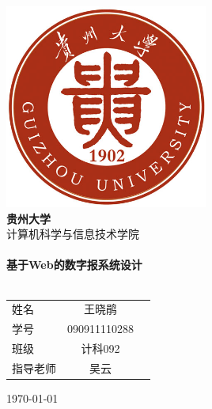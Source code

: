
\begin{titlepage}
\begin{center}

\includegraphics[width=0.5\textwidth]{./images/university-logo}\\[1cm]
\textbf{\Huge 贵州大学}\\[1cm]
\textsc{\Large 计算机科学与信息技术学院}\\[1.5cm]

\HRule\\[0.4cm]
\textbf{\Huge 基于Web的数字报系统设计}\\[0.4cm]
\HRule\\[1.5cm]

\begin{tabular}{ l c r }
  姓名 & 王晓鹃 \\[0.2cm]
  学号 & 090911110288 \\[0.2cm]
  班级 & 计科092 \\[0.2cm]
  指导老师 & 吴云 \\[0.2cm]
\end{tabular}

\vfill

{\Large \today}

\end{center}
\end{titlepage}